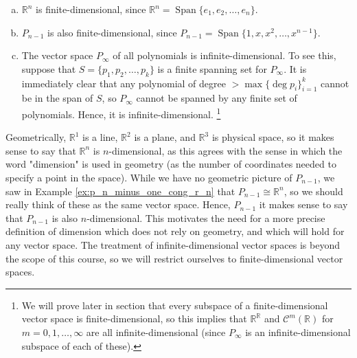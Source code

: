 \documentclass[12pt,letterpaper,reqno]{article}
\numberwithin{equation}{section}
\newcommand{\R}{\ensuremath{\mathbb R}}
\DeclareMathOperator{\Span}{Span}
\newcommand{\fixme}[1]{{\color{orange}{[#1]}}}
\begin{document}
\begin{example}
\begin{enumerate}[(a)]\hspace{15cm}
	\item $\mathbb{R}^n$ is finite-dimensional, since $\mathbb{R}^n=\Span\{e_1,e_2,\dots,e_n\}$.
	\item $P_{n-1}$ is also finite-dimensional, since $P_{n-1}=\Span\{1,x,x^2,\dots,x^{n-1}\}$.
	\item The vector space $P_\infty$ of all polynomials is infinite-dimensional. To see this, suppose that $S=\{p_1,p_2,\dots,p_k\}$ is a finite spanning set for $P_\infty$. It is immediately clear that any polynomial of degree $> \max\{\deg p_i\}_{i=1}^k$ cannot be in the span of $S$, so $P_\infty$ cannot be spanned by any finite set of polynomials. Hence, it is infinite-dimensional. \footnote{We will prove later in section \fixme{Add link.} that every subspace of a finite-dimensional vector space is finite-dimensional, so this implies that $\R^\R$ and $\mathscr{C}^{m}(\R)$ for $m=0,1,\dots,\infty$ are all infinite-dimensional (since $P_\infty$ is an infinite-dimensional subspace of each of these).}
\end{enumerate}	
\end{example}

Geometrically, $\R^1$ is a line, $\R^2$ is a plane, and $\R^3$ is physical space, so it makes sense to say that $\R^n$ is $n$-dimensional, as this agrees with the sense in which the word "dimension" is used in geometry (as the number of coordinates needed to specify a point in the space). While we have no geometric picture of $P_{n-1}$, we saw in Example \ref{ex:p_n_minus_one_cong_r_n} that $P_{n-1} \cong \R^n$, so we should really think of these as the same vector space. Hence, $P_{n-1}$ it makes sense to say that $P_{n-1}$ is also $n$-dimensional. This motivates the need for a more precise definition of dimension which does not rely on geometry, and which will hold for any vector space. The treatment of infinite-dimensional vector spaces is beyond the scope of this course, so we will restrict ourselves to finite-dimensional vector spaces.
\end{document}
